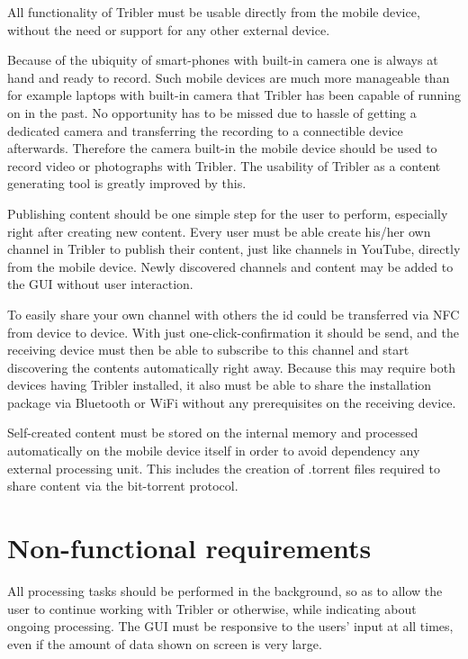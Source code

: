 All functionality of Tribler must be usable directly from the mobile device, without the need or support for any other external device.

Because of the ubiquity of smart-phones with built-in camera one is always at hand and ready to record.
Such mobile devices are much more manageable than for example laptops with built-in camera that Tribler has been capable of running on in the past.
No opportunity has to be missed due to hassle of getting a dedicated camera and transferring the recording to a connectible device afterwards.
Therefore the camera built-in the mobile device should be used to record video or photographs with Tribler.
The usability of Tribler as a content generating tool is greatly improved by this. 

Publishing content should be one simple step for the user to perform, especially right after creating new content.
Every user must be able create his/her own channel in Tribler to publish their content, just like channels in YouTube, directly from the mobile device.
Newly discovered channels and content may be added to the GUI without user interaction.

To easily share your own channel with others the id could be transferred via NFC from device to device.
With just one-click-confirmation it should be send, and the receiving device must then be able to subscribe to this channel and start discovering the contents automatically right away.
Because this may require both devices having Tribler installed, it also must be able to share the installation package via Bluetooth or WiFi without any prerequisites on the receiving device.

Self-created content must be stored on the internal memory and processed automatically on the mobile device itself in order to avoid dependency any external processing unit.
This includes the creation of .torrent files required to share content via the bit-torrent protocol.







\section{Non-functional requirements}

All processing tasks should be performed in the background, so as to allow the user to continue working with Tribler or otherwise, while indicating about ongoing processing.
The GUI must be responsive to the users' input at all times, even if the amount of data shown on screen is very large.


